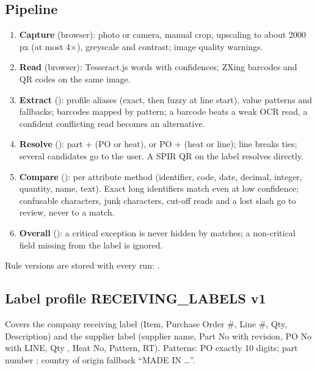 \documentclass[11pt,a4paper]{article}
\begin{document}
\subsection{Pipeline}
\begin{enumerate}
  \item \textbf{Capture} (browser): photo or camera, manual crop, upscaling to about 2000\,px (at most 4×), greyscale and
    contrast; image quality warnings.
  \item \textbf{Read} (browser): Tesseract.js words with confidences; ZXing barcodes and QR codes on the same image.
  \item \textbf{Extract} (): profile aliases (exact, then fuzzy at line start), value patterns
    and fallbacks; barcodes mapped by pattern; a barcode beats a weak OCR read, a confident conflicting read becomes an
    alternative.
  \item \textbf{Resolve} (): part + (PO or heat), or PO + (heat or line); line breaks ties; several
    candidates go to the user. A SPIR QR on the label resolves directly.
  \item \textbf{Compare} (): per attribute method (identifier, code, date, decimal, integer, quantity,
    name, text). Exact long identifiers match even at low confidence; confusable characters, junk characters, cut-off
    reads and a lost slash go to review, never to a match.
  \item \textbf{Overall} (): a critical exception is never hidden by matches; a non-critical field
    missing from the label is ignored.
\end{enumerate}
Rule versions are stored with every run: .

\subsection{Label profile RECEIVING\_LABELS v1}
Covers the company receiving label (Item, Purchase Order \#, Line \#, Qty, Description) and the supplier label (supplier
name, Part No with revision, PO No with LINE, Qty , Heat No, Pattern, RT). Patterns: PO exactly 10 digits;
part number ; country of origin fallback ``MADE IN \ldots''.

\end{document}
